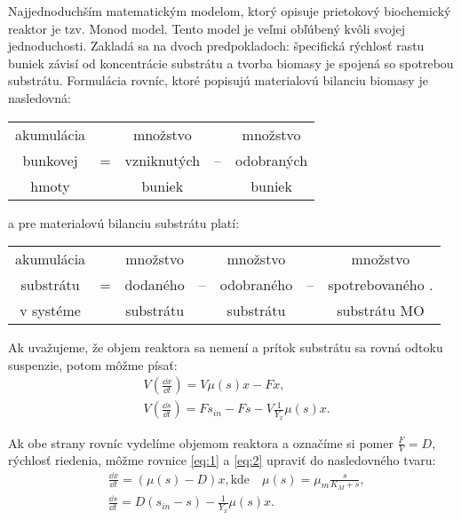 Najjednoduchším matematickým modelom, ktorý opisuje prietokový biochemický reaktor je tzv. Monod model. Tento model je veľmi obľúbený kvôli svojej jednoduchosti. Zakladá sa na dvoch predpokladoch:  špecifická rýchlosť rastu buniek závisí od koncentrácie substrátu a   tvorba biomasy je spojená so spotrebou substrátu. Formulácia rovníc, ktoré popisujú materialovú bilanciu biomasy je nasledovná:
\begin{table}[H]
	\centering
	\begin{tabular}{ccccc}
		akumulácia & & množstvo & & množstvo \\
		bunkovej & = & vzniknutých & -- & odobraných \\
		hmoty & & buniek & & buniek \\
	\end{tabular}
\end{table}
\noindent a pre materialovú bilanciu substrátu platí:
\begin{table}[H]
	\centering
	\begin{tabular}{ccccccc}
		akumulácia & & množstvo & & množstvo & & množstvo\\
		substrátu & = & dodaného & -- & odobraného & -- & spotrebovaného .\\
		v systéme & & substrátu & & substrátu & & substrátu MO\\
	\end{tabular}
\end{table}
\noindent Ak uvažujeme, že objem reaktora sa nemení a prítok substrátu sa rovná odtoku suspenzie, potom môžme písať: 
\begin{align}
	&V\left(\frac{\dd x}{\dd t}\right) = V\mu(s)x - Fx, \label{eq:1} \\
	&V\left(\frac{\dd s}{\dd t}\right) = Fs_{in} - Fs - V\frac{1}{Y_{x}}\mu(s)x. \label{eq:2}
\end{align}

\noindent Ak obe strany rovníc vydelíme objemom reaktora a označíme si pomer $\frac{F}{V} = D$, rýchlosť riedenia, môžme rovnice \ref{eq:1} a \ref{eq:2} upraviť do nasledovného tvaru:
\begin{align} 
	&\frac{\dd x}{\dd t} = \left(\mu(s) - D\right)x, \text{kde}  \quad \mu(s) = \mu_{m}\frac{s}{K_{M} + s}, \label{eq:3} \\
	&\frac{\dd s}{\dd t} = D\left(s_{in} - s\right) - \frac{1}{Y_{x}}\mu(s)x. \label{eq:4}
\end{align}

